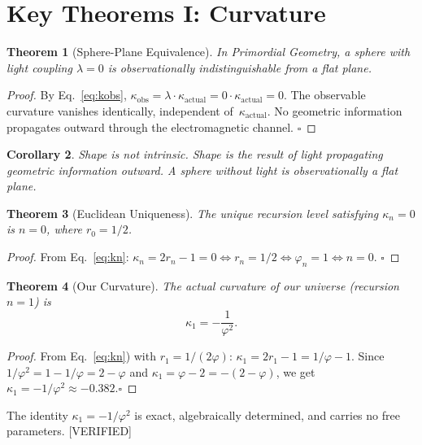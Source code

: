 \documentclass[prd,twocolumn,preprintnumbers,amsmath,amssymb]{revtex4-2}
\newtheorem{theorem}{Theorem}
\newtheorem{corollary}[theorem]{Corollary}
\newcommand{\verified}{\textcolor{green!60!black}{[VERIFIED]}}
\newcommand{\phig}{\varphi}
\newcommand{\kact}{\kappa_{\mathrm{actual}}}
\newcommand{\kobs}{\kappa_{\mathrm{obs}}}
\begin{document}
\section{Key Theorems I: Curvature}
\label{sec:theorems}

\begin{theorem}[Sphere-Plane Equivalence]
In Primordial Geometry, a sphere with light coupling $\lambda=0$ is
observationally indistinguishable from a flat plane.
\end{theorem}
\begin{proof}
By Eq.~\eqref{eq:kobs}, $\kobs = \lambda\cdot\kact = 0\cdot\kact = 0$.  The
observable curvature vanishes identically, independent of~$\kact$.  No
geometric information propagates outward through the electromagnetic channel.
\hfill$\square$
\end{proof}

\begin{corollary}
Shape is not intrinsic.  Shape is the result of light propagating geometric
information outward.  A sphere without light is observationally a flat plane.
\end{corollary}

\begin{theorem}[Euclidean Uniqueness]
The unique recursion level satisfying $\kappa_n = 0$ is $n=0$, where $r_0=1/2$.
\end{theorem}
\begin{proof}
From Eq.~\eqref{eq:kn}:
$\kappa_n = 2r_n - 1 = 0 \iff r_n = 1/2 \iff \phig_n = 1 \iff n = 0$.
\hfill$\square$
\end{proof}

\begin{theorem}[Our Curvature]
The actual curvature of our universe (recursion $n=1$) is
\begin{equation}
  \kappa_1 = -\frac{1}{\phig^2}.
  \label{eq:k1}
\end{equation}
\end{theorem}
\begin{proof}
From Eq.~\eqref{eq:kn}) with $r_1 = 1/(2\phig)$:
$\kappa_1 = 2r_1 - 1 = 1/\phig - 1$.
Since $1/\phig^2 = 1 - 1/\phig = 2 - \phig$ and $\kappa_1 = \phig - 2 = -(2-\phig)$,
we get $\kappa_1 = -1/\phig^2 \approx -0.382$.\hfill$\square$
\end{proof}
The identity $\kappa_1 = -1/\phig^2$ is exact, algebraically determined, and
carries no free parameters.  \verified
\end{document}
